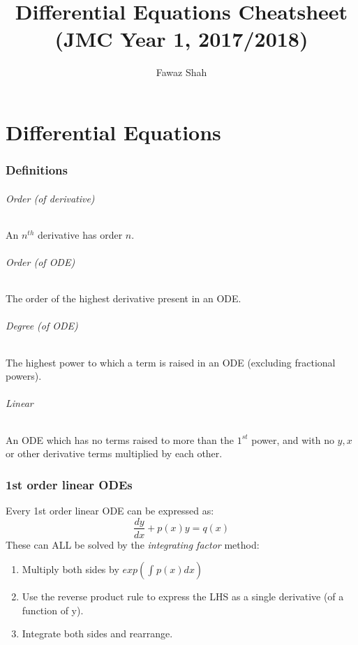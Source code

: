 \documentclass{article}
\title{Differential Equations Cheatsheet (JMC Year 1, 2017/2018)}
\date{}
\author{Fawaz Shah}
\begin{document}
\large
\maketitle
\tableofcontents
\newpage
\part{Differential Equations}
  
\section{Definitions}

\paragraph{Order (of derivative)}
An $ n^{th} $ derivative has order $ n $.

\paragraph{Order (of ODE)}
The order of the highest derivative present in an ODE.

\paragraph{Degree (of ODE)}
The highest power to which a term is raised in an ODE (excluding fractional powers).

\paragraph*{Linear}
An ODE which has no terms raised to more than the $ 1^{st} $ power, and with no $ y, x $ or other derivative terms multiplied by each other.
    
\section{1st order linear ODEs}
Every 1st order linear ODE can be expressed as:
\begin{equation}
\frac{dy}{dx} + p(x)y = q(x)
\end{equation}
These can ALL be solved by the \emph{integrating factor} method:
\begin{enumerate}
\item Multiply both sides by $ exp(\int_{}^{} p(x) dx) $
\item Use the reverse product rule to express the LHS as a single derivative (of a function of y).
\item Integrate both sides and rearrange.
\end{enumerate}
  
\end{document}
